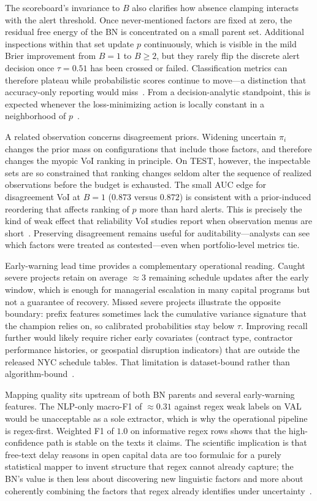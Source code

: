 The scoreboard's invariance to $B$ also clarifies how absence clamping interacts with the alert threshold. Once never-mentioned factors are fixed at zero, the residual free energy of the BN is concentrated on a small parent set. Additional inspections within that set update $p$ continuously, which is visible in the mild Brier improvement from $B{=}1$ to $B{\geq}2$, but they rarely flip the discrete alert decision once $\tau{=}0.51$ has been crossed or failed. Classification metrics can therefore plateau while probabilistic scores continue to move---a distinction that accuracy-only reporting would miss~\cite{Gneiting2007,Murphy1973}. From a decision-analytic standpoint, this is expected whenever the loss-minimizing action is locally constant in a neighborhood of $p$~\cite{Howard1966,Vickers2006}.

A related observation concerns disagreement priors. Widening uncertain $\pi_i$ changes the prior mass on configurations that include those factors, and therefore changes the myopic VoI ranking in principle. On TEST, however, the inspectable sets are so constrained that ranking changes seldom alter the sequence of realized observations before the budget is exhausted. The small AUC edge for disagreement VoI at $B{=}1$ ($0.873$ versus $0.872$) is consistent with a prior-induced reordering that affects ranking of $p$ more than hard alerts. This is precisely the kind of weak effect that reliability VoI studies report when observation menus are short~\cite{Song2021,Memarzadeh2016,Fauriat2020}. Preserving disagreement remains useful for auditability---analysts can see which factors were treated as contested---even when portfolio-level metrics tie.

Early-warning lead time provides a complementary operational reading. Caught severe projects retain on average ${\approx}3$ remaining schedule updates after the early window, which is enough for managerial escalation in many capital programs but not a guarantee of recovery. Missed severe projects illustrate the opposite boundary: prefix features sometimes lack the cumulative variance signature that the champion relies on, so calibrated probabilities stay below $\tau$. Improving recall further would likely require richer early covariates (contract type, contractor performance histories, or geospatial disruption indicators) that are outside the released NYC schedule tables. That limitation is dataset-bound rather than algorithm-bound~\cite{Tagharobi2025,Egwim2021,Woldesenbet2016}.

Mapping quality sits upstream of both BN parents and several early-warning features. The NLP-only macro-F1 of ${\approx}0.31$ against regex weak labels on VAL would be unacceptable as a sole extractor, which is why the operational pipeline is regex-first. Weighted F1 of $1.0$ on informative regex rows shows that the high-confidence path is stable on the texts it claims. The scientific implication is that free-text delay reasons in open capital data are too formulaic for a purely statistical mapper to invent structure that regex cannot already capture; the BN's value is then less about discovering new linguistic factors and more about coherently combining the factors that regex already identifies under uncertainty~\cite{Onisko2001,Luu2009}.

